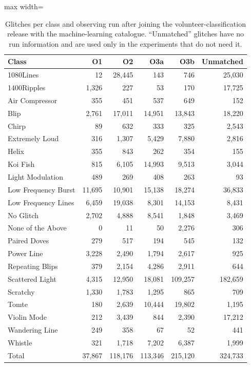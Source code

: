 \begin{table}[!htb]
\caption{Glitches per class and observing run after joining the volunteer-classification release with the
machine-learning catalogue. ``Unmatched'' glitches have no run information and are used only in the experiments that do not need it.}\label{tab:data}
\centering\scriptsize\setlength{\tabcolsep}{4pt}
\begin{adjustbox}{max width=\columnwidth}\begin{tabular}{lrrrrr}\toprule
Class & O1 & O2 & O3a & O3b & Unmatched\\\midrule
1080Lines & 12 & 28,445 & 143 & 746 & 25,030 \\
1400Ripples & 1,326 & 227 & 53 & 170 & 17,725 \\
Air Compressor & 355 & 451 & 537 & 649 & 152 \\
Blip & 2,761 & 17,011 & 14,951 & 13,843 & 18,220 \\
Chirp & 89 & 632 & 333 & 325 & 2,543 \\
Extremely Loud & 316 & 1,307 & 5,429 & 7,880 & 2,816 \\
Helix & 355 & 843 & 262 & 354 & 155 \\
Koi Fish & 815 & 6,105 & 14,993 & 9,513 & 3,044 \\
Light Modulation & 489 & 269 & 408 & 263 & 93 \\
Low Frequency Burst & 11,695 & 10,901 & 15,138 & 18,274 & 36,833 \\
Low Frequency Lines & 6,459 & 19,038 & 8,301 & 14,153 & 8,431 \\
No Glitch & 2,702 & 4,888 & 8,541 & 1,848 & 3,469 \\
None of the Above & 0 & 11 & 50 & 2,276 & 306 \\
Paired Doves & 279 & 517 & 194 & 545 & 132 \\
Power Line & 3,228 & 2,490 & 1,794 & 2,617 & 925 \\
Repeating Blips & 379 & 2,154 & 4,286 & 2,911 & 644 \\
Scattered Light & 4,315 & 12,950 & 18,081 & 109,257 & 182,659 \\
Scratchy & 1,330 & 1,783 & 1,295 & 865 & 709 \\
Tomte & 180 & 2,639 & 10,444 & 19,802 & 1,195 \\
Violin Mode & 212 & 3,439 & 844 & 2,390 & 17,212 \\
Wandering Line & 249 & 358 & 67 & 52 & 441 \\
Whistle & 321 & 1,718 & 7,202 & 6,387 & 1,999 \\
\midrule
Total & 37,867 & 118,176 & 113,346 & 215,120 & 324,733 \\\bottomrule
\end{tabular}\end{adjustbox}
\end{table}
